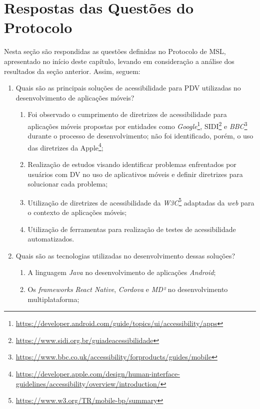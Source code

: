 \newpage

\section{Respostas das Questões do Protocolo}

Nesta seção são respondidas as questões definidas no Protocolo de MSL, apresentado no início deste capítulo, levando em consideração a análise dos resultados da seção anterior.
Assim, seguem:

\begin{enumerate}
    \item Quais são as principais soluções de acessibilidade para PDV utilizadas
          no desenvolvimento de aplicações móveis?
          \begin{enumerate}
              \item Foi observado o cumprimento de diretrizes de acessibilidade para aplicações móveis propostas por entidades
                    como \emph{Google}\footnote{\url{https://developer.android.com/guide/topics/ui/accessibility/apps}},
                    SIDI\footnote{\url{https://www.sidi.org.br/guiadeacessibilidade}} e
                    \emph{BBC}\footnote{\url{https://www.bbc.co.uk/accessibility/forproducts/guides/mobile}}
                    durante o processo de desenvolvimento; não foi identificado, porém, o uso das diretrizes da 
                    Apple\footnote{\url{https://developer.apple.com/design/human-interface-guidelines/accessibility/overview/introduction/}};
              \item Realização de estudos visando identificar problemas enfrentados por usuários com DV no uso de aplicativos móveis e definir diretrizes para solucionar cada problema;
              \item Utilização de diretrizes de acessibilidade da \emph{W3C}\footnote{\url{https://www.w3.org/TR/mobile-bp/summary}} adaptadas da \emph{web} para o contexto de aplicações móveis;
              \item Utilização de ferramentas para realização de testes de acessibilidade automatizados.
          \end{enumerate}
    \item Quais são as tecnologias utilizadas no desenvolvimento dessas soluções?
          \begin{enumerate}
              \item A linguagem \emph{Java} no desenvolvimento de aplicações \emph{Android};
              \item Os \emph{frameworks} \emph{React Native}, \emph{Cordova} e \emph{MD²} no desenvolvimento multiplataforma;

\end{enumerate}
\end{enumerate}
